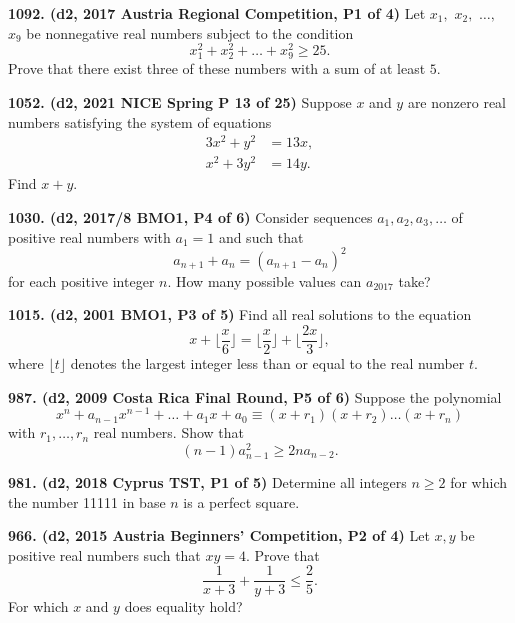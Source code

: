 \documentclass{article}
\begin{document}
\textbf{1092. (\color{red}d2\color{black}, 2017 Austria Regional Competition, P1 of 4)} Let \(x_1,\) \(x_2,\) \(\ldots,\) \(x_9\) be nonnegative real numbers subject to the condition \[x_1^2 + x_2^2 + \ldots + x_9^2 \geq 25.\]  Prove that there exist three of these numbers with a sum of at least \(5.\)

\textbf{1052. (\color{red}d2\color{black}, 2021 NICE Spring P 13 of 25)} Suppose $x$ and $y$ are nonzero real numbers satisfying the system of equations
\begin{align*}
    3x^2 + y^2 & = 13x, \\
    x^2 + 3y^2 & = 14y.
\end{align*}
Find $x+y$.

\textbf{1030. (\color{red}d2\color{black}, 2017/8 BMO1, P4 of 6)} Consider sequences $a_1,a_2,a_3,\ldots$ of positive real numbers with $a_1=1$ and such that $$a_{n+1}+a_n=(a_{n+1}-a_n)^2$$ for each positive integer $n$. How many possible values can $a_{2017}$ take?

\textbf{1015. (\color{red}d2\color{black}, 2001 BMO1, P3 of 5)} Find all real solutions to the equation \begin{equation*}x + \lfloor\frac{x}{6}\rfloor = \lfloor\frac{x}{2}\rfloor + \lfloor\frac{2x}{3}\rfloor,\end{equation*} where $\lfloor t\rfloor$ denotes the largest integer less than or equal to the real number $t$.

\textbf{987. (\color{red}d2\color{black}, 2009 Costa Rica Final Round, P5 of 6)} Suppose the polynomial \begin{equation*}x^n + a_{n-1}x^{n-1} + \dots + a_1x + a_0 \equiv (x+r_1)(x+r_2)\dots(x+r_n)\end{equation*} with $r_1, \dots, r_n$ real numbers. Show that \begin{equation*}(n-1)a_{n-1}^2 \ge 2na_{n-2}.\end{equation*}

\textbf{981. (\color{red}d2\color{black}, 2018 Cyprus TST, P1 of 5)} Determine all integers $n \geq 2$ for which the number 11111 in base $n$ is a perfect square.

\textbf{966. (\color{red}d2\color{black}, 2015 Austria Beginners' Competition,  P2 of 4)} Let $x, y$ be positive real numbers such that $xy = 4$. Prove that \begin{equation*}\frac{1}{x+3} + \frac{1}{y+3} \le \frac{2}{5}.\end{equation*} For which $x$ and $y$ does equality hold?
\end{document}
